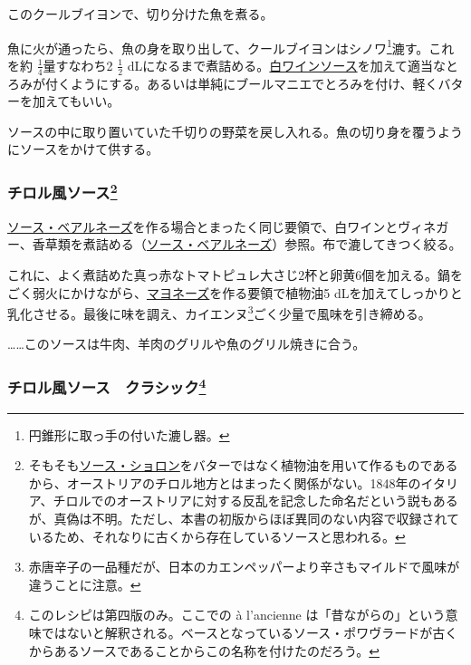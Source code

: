 \begin{recette}
このクールブイヨンで、切り分けた魚を煮る。

魚に火が通ったら、魚の身を取り出して、クールブイヨンはシノワ\footnote{円錐形に取っ手の付いた漉し器。}漉す。これを約
\(\frac{1}{4}\)量すなわち2 \(\frac{1}{2}\)
dLになるまで煮詰める。\protect\hyperlink{sauce-vin-blanc}{白ワインソース}を加えて適当なとろみが付くようにする。あるいは単純にブールマニエでとろみを付け、軽くバターを加えてもいい。

ソースの中に取り置いていた千切りの野菜を戻し入れる。魚の切り身を覆うようにソースをかけて供する。

\hypertarget{sauce-tyrolienne}{%
\subsubsection[チロル風ソース]{\texorpdfstring{チロル風ソース\footnote{そもそも\protect\hyperlink{sauce-choron}{ソース・ショロン}をバターではなく植物油を用いて作るものであるから、オーストリアのチロル地方とはまったく関係がない。1848年のイタリア、チロルでのオーストリアに対する反乱を記念した命名だという説もあるが、真偽は不明。ただし、本書の初版からほぼ異同のない内容で収録されているため、それなりに古くから存在しているソースと思われる。}}{チロル風ソース}}\label{sauce-tyrolienne}}



\protect\hyperlink{sauce-bearnaise}{ソース・ベアルネーズ}を作る場合とまったく同じ要領で、白ワインとヴィネガー、香草類を煮詰める（\protect\hyperlink{sauce-bearnaise}{ソース・ベアルネーズ}）参照。布で漉してきつく絞る。

これに、よく煮詰めた真っ赤なトマトピュレ大さじ2杯と卵黄6個を加える。鍋をごく弱火にかけながら、\protect\hyperlink{mayonnaise}{マヨネーズ}を作る要領で植物油5
dLを加えてしっかりと乳化させる。最後に味を調え、カイエンヌ\footnote{赤唐辛子の一品種だが、日本のカエンペッパーより辛さもマイルドで風味が違うことに注意。}ごく少量で風味を引き締める。

\ldots{}\ldots{}このソースは牛肉、羊肉のグリルや魚のグリル焼きに合う。

\hypertarget{sauce-tyrolienne-a-l-ancienne}{%
\subsubsection[チロル風ソース　クラシック]{\texorpdfstring{チロル風ソース　クラシック\footnote{このレシピは第四版のみ。ここでの
  à l'ancienne
  は「昔ながらの」という意味ではないと解釈される。ベースとなっているソース・ポワヴラードが古くからあるソースであることからこの名称を付けたのだろう。}}{チロル風ソース　クラシック}}\label{sauce-tyrolienne-a-l-ancienne}}


\end{recette}
